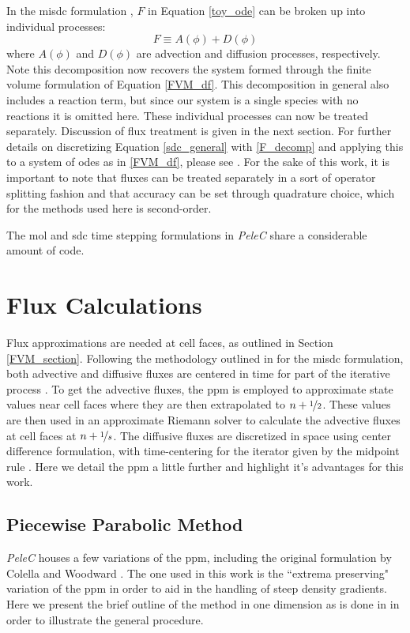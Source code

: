 In the \gls{misdc} formulation \cite{MISDC_general}, $F$ in Equation \ref{toy_ode} can be broken up into individual processes: 
\begin{equation} \label{F_decomp}
F \equiv A(\phi) + D(\phi)
\end{equation}
where $A(\phi)$ and $D(\phi)$ are advection and diffusion processes, respectively. Note this decomposition now recovers the system formed through the finite volume formulation of Equation \ref{FVM_df}. This decomposition in general also includes a reaction term, but since our system is a single species with no reactions it is omitted here. These individual processes can now be treated separately. Discussion of flux treatment is given in the next section. For further details on discretizing Equation \ref{sdc_general} with \ref{F_decomp} and applying this to a system of \gls{ode}s as in \ref{FVM_df}, please see \cite{SDC_PeleC}. For the sake of this work, it is important to note that fluxes can be treated separately in a sort of operator splitting fashion and that accuracy can be set through quadrature choice, which for the methods used here is second-order. 

The \gls{mol} and \gls{sdc} time stepping formulations in \textit{PeleC} share a considerable amount of code. 




\section{Flux Calculations}
Flux approximations are needed at cell faces, as outlined in Section \ref{FVM_section}. Following the methodology outlined in for the \gls{misdc} formulation, both advective and diffusive fluxes are centered in time for part of the iterative process \cite{MISDC_general}. To get the advective fluxes, the \gls{ppm} \cite{1984JCoPPPM} is employed to approximate state values near cell faces where they are then extrapolated to $n+\nicefrac{1}{2}$. These values are then used in an approximate Riemann solver \cite{COLELLA1985264} to calculate the advective fluxes at cell faces at $n+\nicefrac{1}{s}$. The diffusive fluxes are discretized in space using center difference formulation, with time-centering for the iterator given by the midpoint rule \cite{COLELLA20087069, MILLER200226}. Here we detail the \gls{ppm} a little further and highlight it's advantages for this work.
\subsection{Piecewise Parabolic Method}
\textit{PeleC} houses a few variations of the \gls{ppm}, including the original formulation by Colella and Woodward \cite{1984JCoPPPM}. The one used in this work is the ``extrema preserving" variation of the \gls{ppm} \cite{COLELLA20087069, MILLER200226} in order to aid in the handling of steep density gradients. Here we present the brief outline of the method in one dimension as is done in \cite{PPM_WENO} in order to illustrate the general procedure. 

